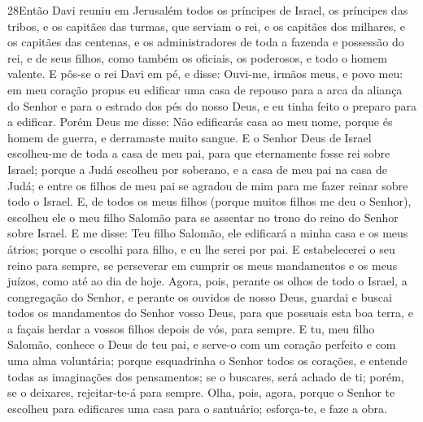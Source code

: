 \lettrine{28} Então Davi reuniu em Jerusalém todos os
príncipes de Israel, os príncipes das tribos, e os capitães das
turmas, que serviam o rei, e os capitães dos milhares, e os capitães
das centenas, e os administradores de toda a fazenda e possessão do
rei, e de seus filhos, como também os oficiais, os poderosos, e todo
o homem valente. E pôs-se o rei Davi em pé, e disse: Ouvi-me,
irmãos meus, e povo meu: em meu coração propus eu edificar uma casa
de repouso para a arca da aliança do Senhor e para o estrado dos pés
do nosso Deus, e eu tinha feito o preparo para a edificar. Porém
Deus me disse: Não edificarás casa ao meu nome, porque és homem de
guerra, e derramaste muito sangue. E o Senhor Deus de Israel
escolheu-me de toda a casa de meu pai, para que eternamente fosse
rei sobre Israel; porque a Judá escolheu por soberano, e a casa de
meu pai na casa de Judá; e entre os filhos de meu pai se agradou de
mim para me fazer reinar sobre todo o Israel. E, de todos os
meus filhos (porque muitos filhos me deu o Senhor), escolheu ele o
meu filho Salomão para se assentar no trono do reino do Senhor sobre
Israel. E me disse: Teu filho Salomão, ele edificará a minha
casa e os meus átrios; porque o escolhi para filho, e eu lhe serei
por pai. E estabelecerei o seu reino para sempre, se perseverar
em cumprir os meus mandamentos e os meus juízos, como até ao dia de
hoje. Agora, pois, perante os olhos de todo o Israel, a
congregação do Senhor, e perante os ouvidos de nosso Deus, guardai e
buscai todos os mandamentos do Senhor vosso Deus, para que possuais
esta boa terra, e a façais herdar a vossos filhos depois de vós,
para sempre. E tu, meu filho Salomão, conhece o Deus de teu pai,
e serve-o com um coração perfeito e com uma alma voluntária; porque
esquadrinha o Senhor todos os corações, e entende todas as
imaginações dos pensamentos; se o buscares, será achado de ti;
porém, se o deixares, rejeitar-te-á para sempre. Olha, pois,
agora, porque o Senhor te escolheu para edificares uma casa para o
santuário; esforça-te, e faze a obra.

